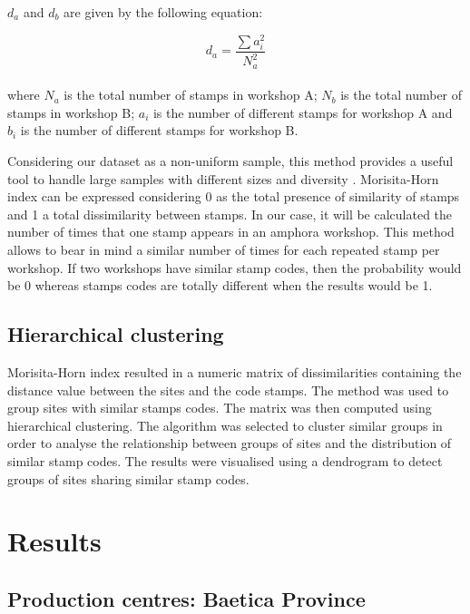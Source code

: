\documentclass[review]{elsarticle}
\begin{document}
$d_{a}$ and $d_{b}$ are given by the following equation:

\begin{equation}
d_{a} = \frac{\sum a_{i}^{2}}{N_{a}^{2}} 
\end{equation} \\

where $N_{a}$ is the total number of stamps in workshop A; $N_{b}$ is the total number of stamps in workshop B; $a_{i}$ is the number of different stamps for workshop A and $b_{i}$ is the number of different stamps for workshop B.

Considering our dataset as a non-uniform sample, this method provides a useful tool to handle large samples with different sizes and diversity \citep{wolda_similarity_1981}. Morisita-Horn index can be expressed considering 0 as the total presence of similarity of stamps and 1 a total dissimilarity between stamps. In our case, it will be calculated the number of times that one stamp appears in an amphora workshop. This method allows to bear in mind a similar number of times for each repeated stamp per workshop. If two workshops have similar stamp codes, then the probability would be 0 whereas stamps codes are totally different when the results would be 1. 

\subsection{Hierarchical clustering}

Morisita-Horn index resulted in a numeric matrix of dissimilarities containing the distance value between the sites and the code stamps. The method was used to group sites with similar stamps codes. The matrix was then computed using hierarchical clustering. The algorithm was selected to cluster similar groups in order to analyse the relationship between groups of sites and the distribution of similar stamp codes. The results were visualised using a dendrogram to detect groups of sites sharing similar stamp codes.  


\section{Results}

\subsection{Production centres: Baetica Province}

\end{document}
